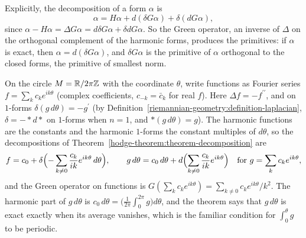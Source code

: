 Explicitly, the decomposition of a form $\alpha$ is
\[
\alpha = H\alpha + d(\delta G\alpha) + \delta(dG\alpha),
\]
since $\alpha - H\alpha = \Delta G\alpha = d\delta G\alpha + \delta dG\alpha$. So the Green operator, an inverse of $\Delta$ on the orthogonal complement of the harmonic forms, produces the primitives: if $\alpha$ is
exact, then $\alpha = d(\delta G\alpha)$, and $\delta G\alpha$ is the primitive of $\alpha$ orthogonal to the closed forms, the primitive of smallest norm.

\begin{example}\label{hodge-theorem:example-circle-decomposition}
On the circle $M = \mathbb{R}/2\pi\mathbb{Z}$ with the coordinate $\theta$, write functions as Fourier series $f = \sum_kc_ke^{ik\theta}$ (complex coefficients, $c_{-k} = \bar c_k$ for real $f$). Here $\Delta f = -f^{\prime\prime}$,
and on $1$-forms $\delta(g\,d\theta) = -g^{\prime}$ (by Definition~\ref{riemannian-geometry:definition-laplacian}, $\delta = -{*}d{*}$ on $1$-forms when $n = 1$, and $*(g\,d\theta) = g$). The harmonic functions are the
constants and the harmonic $1$-forms the constant multiples of $d\theta$, so the decompositions of Theorem~\ref{hodge-theorem:theorem-decomposition} are
\[
f = c_0 + \delta\Bigl(-\sum_{k \neq 0}\frac{c_k}{ik}e^{ik\theta}\,d\theta\Bigr), \qquad g\,d\theta = c_0\,d\theta + d\Bigl(\sum_{k \neq 0}\frac{c_k}{ik}e^{ik\theta}\Bigr) \quad\text{for } g = \sum_kc_ke^{ik\theta},
\]
and the Green operator on functions is $G(\sum_kc_ke^{ik\theta}) = \sum_{k \neq 0}c_ke^{ik\theta}/k^2$. The harmonic part of $g\,d\theta$ is $c_0\,d\theta = \bigl(\frac{1}{2\pi}\int_0^{2\pi}g\bigr)d\theta$, and the theorem
says that $g\,d\theta$ is exact exactly when its average vanishes, which is the familiar condition for $\int_0^\theta g$ to be periodic.
\end{example}

